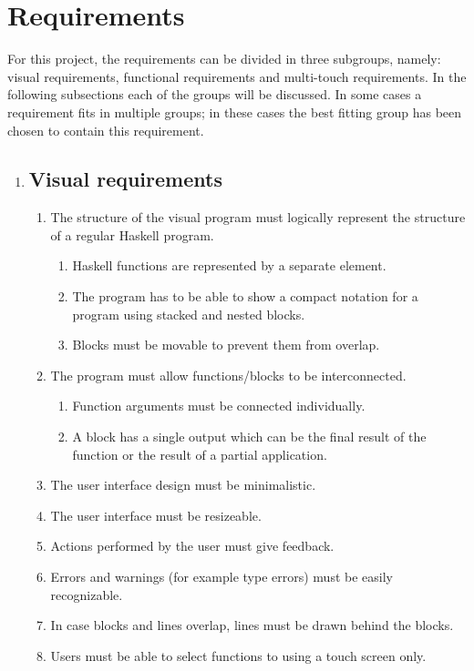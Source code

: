 \section{Requirements}

For this project, the requirements can be divided in three subgroups, namely: visual requirements, functional requirements and multi-touch requirements. In the following subsections each of the groups will be discussed. In some cases a requirement fits in multiple groups; in these cases the best fitting group has been chosen to contain this requirement.

\begin{enumerate}
\item \subsection*{Visual requirements} 

\begin{enumerate}
	\item The structure of the visual program must logically represent the structure of a regular Haskell program.
		\begin{enumerate}
			\item Haskell functions are represented by a separate element.
			\item The program has to be able to show a compact notation for a program using stacked and nested blocks.
			\item Blocks must be movable to prevent them from overlap.
		\end{enumerate}
	\item The program must allow functions/blocks to be interconnected.
		\begin{enumerate}
			\item Function arguments must be connected individually.
			\item A block has a single output which can be the final result of the function or the result of a partial application.
		\end{enumerate}
	\item The user interface design must be minimalistic.
	\item The user interface must be resizeable.
	\item Actions performed by the user must give feedback.
	\item Errors and warnings (for example type errors) must be easily recognizable.
	\item In case blocks and lines overlap, lines must be drawn behind the blocks.
	\item Users must be able to select functions to using a touch screen only.
\end{enumerate}


\end{enumerate}
